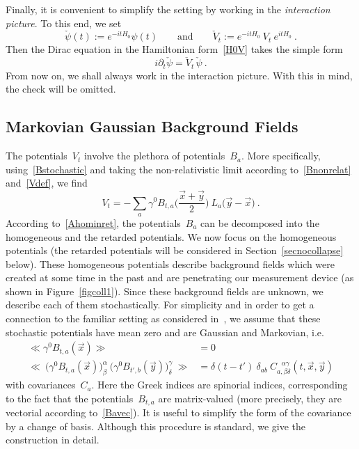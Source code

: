 \documentclass[reqno,11pt]{amsart}
\numberwithin{equation}{section}
\newcommand{\beq}{\begin{equation}}
\newcommand{\eeq}{\end{equation}}
\newcommand{\bbra}{\mathopen{\ll}}
\newcommand{\kket}{\mathclose{\gg}}
\newcommand{\1}{\mathds{1}}
\begin{document}
Finally, it is convenient to simplify the setting by working in the {\em{interaction picture}}. To this end, we set
\[ \check{\psi}(t) := e^{-i t H_0} \psi(t) \qquad \text{and} \qquad
\check{V}_t := e^{-i t H_0}\: V_t\: e^{i t H_0} \:. \]
Then the Dirac equation in the Hamiltonian form~\eqref{H0V} takes the simple form
\beq \label{HOVint}
i \partial_t \check{\psi} = \check{V}_t \,\check{\psi} \:.
\eeq
From now on, we shall always work in the interaction picture. With this in mind, the check will be omitted.

\subsection{Markovian Gaussian Background Fields}
The potentials~$V_t$ involve the ple\-tho\-ra of potentials~$B_a$.
More specifically, using~\eqref{Bstochastic} and taking the non-relativistic limit according
to~\eqref{Bnonrelat} and~\eqref{Vdef}, we find
\beq \label{Vtfirst}
V_t = -\sum_a \gamma^0 B_{t,a}\Big(\frac{\vec{x}+\vec{y}}{2} \Big)\: L_a \big(\vec{y}-\vec{x} \big) \:.
\eeq
According to~\eqref{Ahominret}, the potentials~$B_a$ can be decomposed into the homogeneous
and the retarded potentials. We now focus on the homogeneous potentials
(the retarded potentials will be considered in Section~\ref{secnocollapse} below).
These homogeneous potentials describe background fields which were created
at some time in the past and are penetrating our measurement device (as shown in Figure~\ref{figcoll1}).
Since these background fields are unknown, we describe each of them stochastically.
For simplicity and in order to get a connection to the familiar setting as
considered in~\cite{gisin, bassi-ghirardi}, we
assume that these stochastic potentials have mean zero and are Gaussian and Markovian, i.e.\ 
\begin{align}
\bbra \gamma^0 B_{t,a} (\vec{x}) \kket &= 0 \label{meanC} \\
\bbra \:\big(\gamma^0 B_{t,a}(\vec{x}) \big)^\alpha_\beta\: 
\big( \gamma^0 B_{t',b}(\vec{y}) \big)^\gamma_\delta \:\kket &= \delta(t-t')\: \delta_{ab}\:
C^{\;\:\,\alpha \gamma}_{a, \beta \delta}(t, \vec{x}, \vec{y}) \label{covC}
\end{align}
with covariances~$C_a$.
Here the Greek indices are spinorial indices, corresponding to the fact that the potentials~$B_{t,a}$
are matrix-valued (more precisely, they are vectorial according to~\eqref{Bavec}).
It is useful to simplify the form of the covariance by a change of basis.
Although this procedure is standard, we give the construction in detail.
\end{document}
